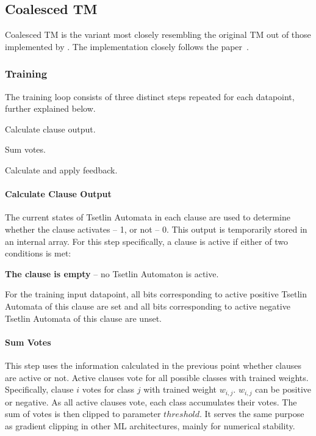 \subsection{Coalesced TM}
Coalesced TM is the variant most closely resembling the original TM out of those implemented by \LibraryName. The implementation closely follows the paper~\cite{glimsdal2021coalescedmultioutputtsetlinmachines}.

\subsubsection{Training}
The training loop consists of three distinct steps repeated for each datapoint, further explained below.
\begin{compactenum}
    \item Calculate clause output.
    \item Sum votes.
    \item Calculate and apply feedback.
\end{compactenum}

\paragraph{Calculate Clause Output}
The current states of Tsetlin Automata in each clause are used to determine whether the clause activates -- 1, or not -- 0. This output is temporarily stored in an internal array. 
For this step specifically, a clause is active if either of two conditions is met:
\begin{compactitem}
    \item \textbf{The clause is empty} -- no Tsetlin Automaton is active.
    \item For the training input datapoint, all bits corresponding to active positive Tsetlin Automata of this clause are set and all bits corresponding to active negative Tsetlin Automata of this clause are unset.
\end{compactitem}

\paragraph{Sum Votes}
This step uses the information calculated in the previous point whether clauses are active or not. Active clauses vote for all possible classes with trained weights. Specifically, clause $i$ votes for class $j$ with trained weight $w_{i,j}$. $w_{i,j}$ can be positive or negative. 
As all active clauses vote, each class accumulates their votes. The sum of votes is then clipped to parameter $threshold$. It serves the same purpose as gradient clipping in other ML architectures, mainly for numerical stability. %

